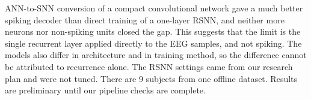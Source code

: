 \documentclass[10pt,letterpaper]{article}
\newcommand{\sect}[1]{\par\vspace{3pt}{\large\bfseries #1}\par\vspace{-1pt}}
\begin{document}
\sect{Interpretation and limits}
ANN-to-SNN conversion of a compact convolutional network gave a much better spiking decoder than direct training of
a one-layer RSNN, and neither more neurons nor non-spiking units closed the gap. This suggests that the limit is the single recurrent layer applied directly to the EEG samples, and not spiking.
The models also differ in architecture and in
training method, so the difference cannot be attributed to recurrence alone. The RSNN settings came from our research
plan and were not tuned. There are 9 subjects from one offline dataset. Results are preliminary until our pipeline checks are complete.
\end{document}
